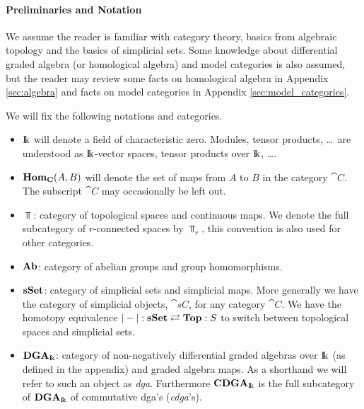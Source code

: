 
\paragraph{Preliminaries and Notation}

We assume the reader is familiar with category theory, basics from algebraic topology and the basics of simplicial sets. Some knowledge about differential graded algebra (or homological algebra) and model categories is also assumed, but the reader may review some facts on homological algebra in Appendix \ref{sec:algebra} and facts on model categories in Appendix \ref{sec:model_categories}.

We will fix the following notations and categories.
\begin{itemize}
	\item $\mathrm{I\!k}$ will denote a field of characteristic zero. Modules, tensor products, \dots\, are understood as $\mathrm{I\!k}$-vector spaces, tensor products over $\mathrm{I\!k}$, \dots.
	\item $\mathbf{Hom}_{\mathbf{C}}(A, B)$ will denote the set of maps from $A$ to $B$ in the category $\cat{C}$. The subscript $\cat{C}$ may occasionally be left out.
	\item $\Top$: category of topological spaces and continuous maps. We denote the full subcategory of $r$-connected spaces by $\Top_r$, this convention is also used for other categories.
	\item $\mathbf{Ab}$: category of abelian groups and group homomorphisms.
	\item $\mathbf{s{\mathbf{Set}}}$: category of simplicial sets and simplicial maps. More generally we have the category of simplicial objects, $\cat{sC}$, for any category $\cat{C}$. We have the homotopy equivalence $|-| : \mathbf{s{\mathbf{Set}}} \rightleftarrows \mathbf{Top} : S$ to switch between topological spaces and simplicial sets.
	\item $\mathbf{DGA}_{\mathrm{I\!k}}$: category of non-negatively differential graded algebras over $\mathrm{I\!k}$ (as defined in the appendix) and graded algebra  maps. As a shorthand we will refer to such an object as \emph{dga}. Furthermore $\mathbf{CDGA}_{\mathrm{I\!k}}$ is the full subcategory of $\mathbf{DGA}_{\mathrm{I\!k}}$ of commutative dga's (\emph{cdga}'s).
\end{itemize}
